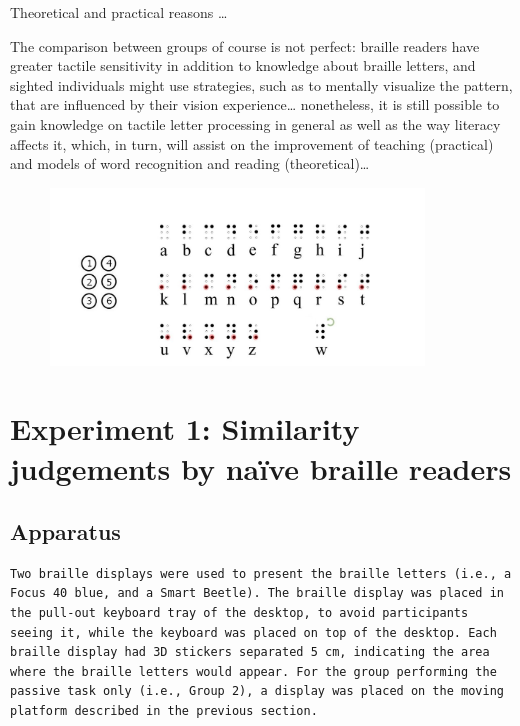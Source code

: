 \documentclass[english,man]{apa7}
\begin{document}
{\colorbox{blue}{\sffamily\scriptsize\bfseries\color{white}{abl}}}{\sffamily\small\itshape\color{blue}{importance}}

Theoretical and practical reasons \ldots{}

{\colorbox{blue}{\sffamily\scriptsize\bfseries\color{white}{abl}}}{\sffamily\small\itshape\color{blue}{limitations on interpretation}}

The comparison between groups of course is not perfect: braille readers have greater tactile sensitivity in addition to knowledge about braille letters, and sighted individuals might use strategies, such as to mentally visualize the pattern, that are influenced by their vision experience\ldots{} nonetheless, it is still possible to gain knowledge on tactile letter processing in general as well as the way literacy affects it, which, in turn, will assist on the improvement of teaching (practical) and models of word recognition and reading (theoretical)\ldots{}

\begin{figure}
\includegraphics[width=3.91in]{FigureBraille_Eng_2} \caption{ }\label{fig:BrailleAlphabet}
\end{figure}

\hypertarget{experiment-1-similarity-judgements-by-nauxefve-braille-readers}{%
\section{Experiment 1: Similarity judgements by naïve braille readers}\label{experiment-1-similarity-judgements-by-nauxefve-braille-readers}}

\hypertarget{apparatus}{%
\subsection{Apparatus}\label{apparatus}}

\begin{verbatim}
Two braille displays were used to present the braille letters (i.e., a Focus 40 blue, and a Smart Beetle). The braille display was placed in the pull-out keyboard tray of the desktop, to avoid participants seeing it, while the keyboard was placed on top of the desktop. Each braille display had 3D stickers separated 5 cm, indicating the area where the braille letters would appear. For the group performing the passive task only (i.e., Group 2), a display was placed on the moving platform described in the previous section. 
\end{verbatim}
\end{document}

